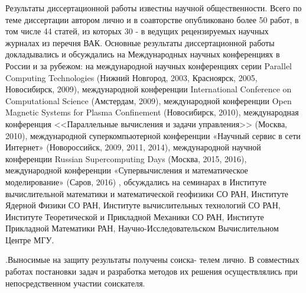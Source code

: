 Результаты диссертационной работы известны научной общественности. Всего по теме диссертации автором лично и в соавторстве опубликовано более 50 работ, в том числе 44 статей, из которых 30 - в ведущих рецензируемых научных журналах из перечня ВАК. Основные результаты диссертационной работы докладывались и обсуждались на Международных научных конференциях в России и за рубежом: на международной научных конференциях серии Parallel Computing Technologies (Нижний Новгород, 2003, Красноярск, 2005, Новосибирск, 2009), международной конференции International Conference on Computational Science (Амстердам, 2009),  международной конференции Open Magnetic Systems for Plasma Confinement (Новосибирск, 2010), международная конференция <<Параллельные вычисления и задачи управления>> (Москва, 2010), международной суперкомпьютерной конференции  «Научный сервис в сети Интернет» (Новороссийск, 2009, 2011, 2014), международной научной конференции Russian Supercomputing Days (Москва, 2015, 2016), международной конференции «Супервычисления и математическое моделирование» (Саров, 2016) , обсуждались на семинарах в Институте вычислительной математики и математической геофизики СО РАН, Институте Ядерной Физики СО РАН, Институте вычислительных технологий СО РАН, Институте Теоретической и Прикладной Механики СО РАН, Институте Прикладной Математики РАН, Научно-Исследовательском Вычислительном Центре МГУ.


{\contribution} .Выносимые на защиту результаты получены соиска-
телем лично. В совместных работах постановки задач и разработка методов их решения осуществлялись при непосредственном участии соискателя.



